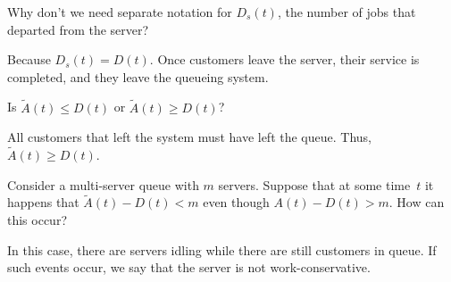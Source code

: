 \begin{exercise}
Why don't we need separate notation for $D_s(t)$, the number
    of jobs that departed from the server? 
\begin{solution}
 Because $D_s(t) = D(t)$. Once customers leave the server,
    their service is completed, and they leave the queueing system.
  \end{solution}
\end{exercise}



\begin{exercise}
 Is $\tilde A(t) \leq D(t)$ or $\tilde A(t) \geq D(t)$?
\begin{solution}
 All customers that left the system must have left the
    queue. Thus, $\tilde A(t) \geq D(t)$.
  \end{solution}
\end{exercise}





\begin{exercise}
 Consider a multi-server queue with $m$ servers. Suppose that
    at some time~$t$ it happens that $\tilde A(t) - D(t) < m$ even though
    $A(t) - D(t) > m$. How can this occur? 
\begin{solution}
 In this case, there are servers idling while there are still
    customers in queue. If such events occur, we say that the server
    is not work-conservative.
\end{solution}
\end{exercise}


